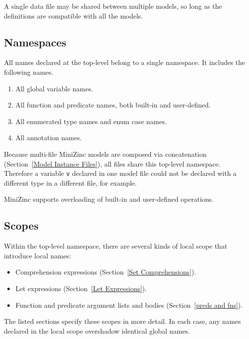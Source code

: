 \documentclass[10pt]{scrartcl}
\begin{document}
A single data file may be shared between multiple models, so long as the
definitions are compatible with all the models.

\subsection{Namespaces}
     \label{Namespaces}
All names declared at the top-level belong to a single namespace.
It includes the following names.
\begin{enumerate}
\item All global variable names.
\item All function and predicate names, both built-in and user-defined.
\item All enumerated type names and enum case names.
\item All annotation names.
\end{enumerate}

Because multi-file MiniZinc models are composed via
concatenation (Section~\ref{Model Instance Files}), all files share
this top-level namespace.  Therefore a variable \texttt{v} declared in one
model file could not be declared with a different type in a different file,
for example.

MiniZinc supports overloading of built-in and user-defined operations.


\subsection{Scopes}
     \label{Scopes}
Within the top-level namespace, there are several kinds of local scope that
introduce local names:
\begin{itemize}
\item Comprehension expressions (Section~\ref{Set Comprehensions}).
\item Let expressions (Section~\ref{Let Expressions}).
\item Function and predicate argument lists and bodies (Section~\ref{preds
      and fns}).
\end{itemize}
The listed sections specify these scopes in more detail.  In each case, any
names declared in the local scope overshadow identical global names.
\end{document}
